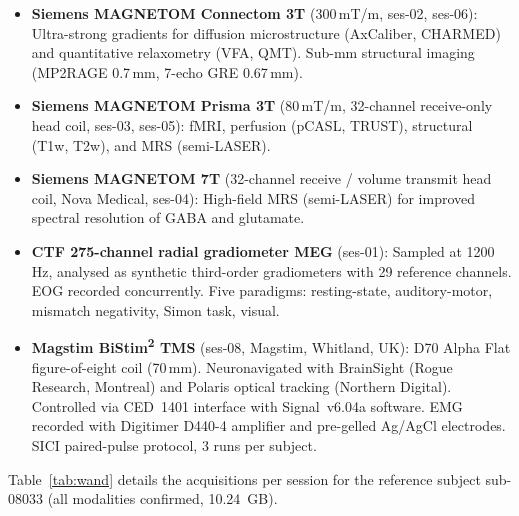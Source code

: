 \documentclass[11pt,a4paper]{article}\usepackage[]{graphicx}\usepackage[]{xcolor}
\begin{document}
\begin{itemize}
  \item \textbf{Siemens MAGNETOM Connectom 3T} (300\,mT/m, ses-02,
    ses-06): Ultra-strong gradients for diffusion microstructure
    (AxCaliber, CHARMED) and quantitative relaxometry (VFA, QMT).
    Sub-mm structural imaging (MP2RAGE 0.7\,mm, 7-echo GRE 0.67\,mm).
  \item \textbf{Siemens MAGNETOM Prisma 3T} (80\,mT/m, 32-channel
    receive-only head coil, ses-03, ses-05): fMRI, perfusion (pCASL,
    TRUST), structural (T1w, T2w), and MRS (semi-LASER).
  \item \textbf{Siemens MAGNETOM 7T} (32-channel receive / volume
    transmit head coil, Nova Medical, ses-04): High-field MRS
    (semi-LASER) for improved spectral resolution of GABA and
    glutamate.
  \item \textbf{CTF 275-channel radial gradiometer MEG} (ses-01):
    Sampled at 1200\,Hz, analysed as synthetic third-order
    gradiometers with 29 reference channels. EOG recorded
    concurrently. Five paradigms: resting-state, auditory-motor,
    mismatch negativity, Simon task, visual.
  \item \textbf{Magstim BiStim\textsuperscript{2} TMS} (ses-08,
    Magstim, Whitland, UK): D70 Alpha Flat figure-of-eight coil
    (70\,mm). Neuronavigated with BrainSight (Rogue Research,
    Montreal) and Polaris optical tracking (Northern Digital).
    Controlled via CED~1401 interface with Signal~v6.04a software.
    EMG recorded with Digitimer D440-4 amplifier and pre-gelled
    Ag/AgCl electrodes. SICI paired-pulse protocol, 3 runs per
    subject.
\end{itemize}

Table~\ref{tab:wand} details the acquisitions per session for the
reference subject sub-08033 (all modalities confirmed, 10.24~GB).
\end{document}
